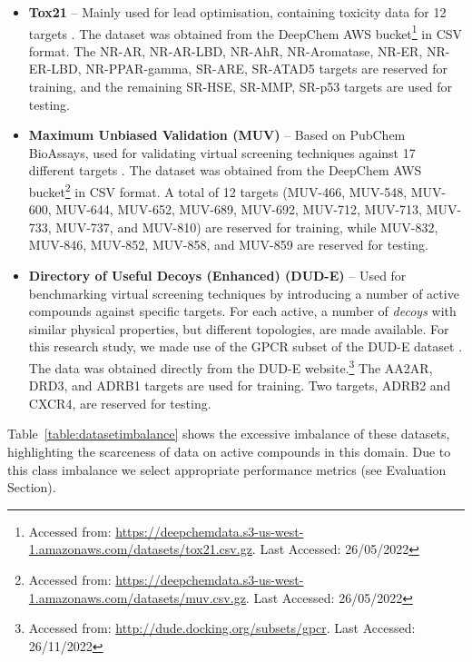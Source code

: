 \begin{itemize}
    
    \item \textbf{Tox21} \citep{huang2016tox21challenge} -- Mainly used for lead optimisation, containing toxicity data for 12 targets \citep{tox21}. The dataset was obtained from the DeepChem AWS bucket\footnote{Accessed from: \url{https://deepchemdata.s3-us-west-1.amazonaws.com/datasets/tox21.csv.gz}. Last Accessed: 26/05/2022} in CSV format. The NR-AR, NR-AR-LBD, NR-AhR, NR-Aromatase, NR-ER, NR-ER-LBD, NR-PPAR-gamma, SR-ARE, SR-ATAD5 targets are reserved for training, and the remaining SR-HSE, SR-MMP, SR-p53 targets are used for testing.
    
    \item \textbf{Maximum Unbiased Validation (MUV)} \citep{rohrer2009maximum} -- Based on PubChem BioAssays, used for validating virtual screening techniques against 17 different targets \citep{rohrer2009maximum}. The dataset was obtained from the DeepChem AWS bucket\footnote{Accessed from: \url{https://deepchemdata.s3-us-west-1.amazonaws.com/datasets/muv.csv.gz}. Last Accessed: 26/05/2022} in CSV format. A total of 12 targets (MUV-466, MUV-548, MUV-600, MUV-644, MUV-652, MUV-689, MUV-692, MUV-712, MUV-713, MUV-733, MUV-737, and MUV-810) are reserved for training, while MUV-832, MUV-846, MUV-852, MUV-858, and MUV-859 are reserved for testing.
    
    \item \textbf{Directory of Useful Decoys (Enhanced) (DUD-E)} \cite{mysinger2012directory} -- Used for benchmarking virtual screening techniques by introducing a number of active compounds against specific targets. For each active, a number of \textit{decoys} with similar physical properties, but different topologies, are made available. For this research study, we made use of the GPCR subset of the DUD-E dataset \citep{mysinger2012directory}. The data was obtained directly from the DUD-E website.\footnote{Accessed from: \url{http://dude.docking.org/subsets/gpcr}. Last Accessed: 26/11/2022} The AA2AR, DRD3, and ADRB1 targets are used for training. Two targets, ADRB2 and CXCR4, are reserved for testing.
\end{itemize}

Table~\ref{table:datasetimbalance} shows the excessive imbalance of these datasets, highlighting the scarceness of data on active compounds in this domain. Due to this class imbalance we select appropriate performance metrics (see Evaluation Section).

